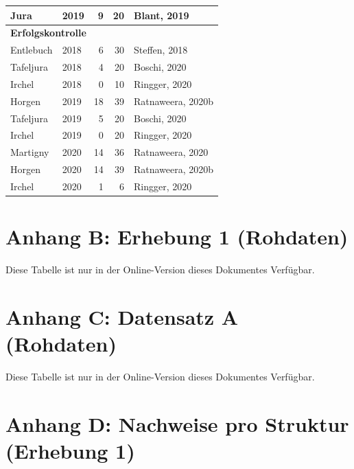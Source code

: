 \documentclass[
  oneside]{scrbook}
\begin{document}
\begin{table}[H]
\begin{tabular}[t]{l|l|r|r|l}
\hline
\hspace{1em}Jura & 2019 & 9 & 20 & Blant, 2019\\
\hline
\multicolumn{5}{l}{\textbf{Erfolgskontrolle}}\\
\hline
\hspace{1em}Entlebuch & 2018 & 6 & 30 & Steffen, 2018\\
\hline
\hspace{1em}Tafeljura & 2018 & 4 & 20 & Boschi, 2020\\
\hline
\hspace{1em}Irchel & 2018 & 0 & 10 & Ringger, 2020\\
\hline
\hspace{1em}Horgen & 2019 & 18 & 39 & Ratnaweera, 2020b\\
\hline
\hspace{1em}Tafeljura & 2019 & 5 & 20 & Boschi, 2020\\
\hline
\hspace{1em}Irchel & 2019 & 0 & 20 & Ringger, 2020\\
\hline
\hspace{1em}Martigny & 2020 & 14 & 36 & Ratnaweera, 2020\\
\hline
\hspace{1em}Horgen & 2020 & 14 & 39 & Ratnaweera, 2020b\\
\hline
\hspace{1em}Irchel & 2020 & 1 & 6 & Ringger, 2020\\
\hline
\end{tabular}
\end{table}

\hypertarget{anhang-b-erhebung-1-rohdaten}{%
\section{Anhang B: Erhebung 1 (Rohdaten)}\label{anhang-b-erhebung-1-rohdaten}}

Diese Tabelle ist nur in der Online-Version dieses Dokumentes Verfügbar.

\hypertarget{anhang-datensatz-a}{%
\section{Anhang C: Datensatz A (Rohdaten)}\label{anhang-datensatz-a}}

Diese Tabelle ist nur in der Online-Version dieses Dokumentes Verfügbar.

\hypertarget{anhang-d-nachweise-pro-struktur-erhebung-1}{%
\section{Anhang D: Nachweise pro Struktur (Erhebung 1)}\label{anhang-d-nachweise-pro-struktur-erhebung-1}}
\end{document}
